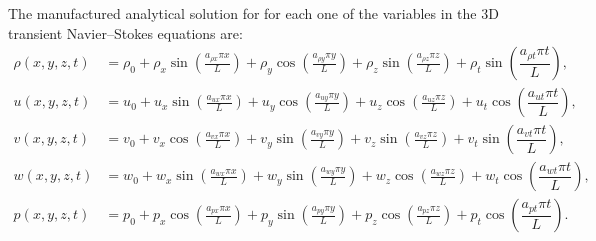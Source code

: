 \documentclass[10pt]{article}
\begin{document}
The manufactured analytical solution for for each one of the variables in the 3D transient Navier--Stokes equations are:
\begin{equation}
\begin{split}
\label{eq:manufactured_3d}
\rho\left( x ,y ,z,t\right) &=  \rho_{0}+ \rho_{x} \sin\left(\frac{a_{ \rho  x} \pi x}{L}\right)+ \rho_{y} \cos\left(\frac{a_{ \rho  y} \pi y}{L}\right) + \rho_{z} \sin\left(\frac{a_{ \rho  z} \pi z}{L}\right) + \rho_t \sin\left(\dfrac{a_{\rho t} \pi t}{L}\right),\\
u\left( x ,y ,z,t\right) &= u_{0}+u_{x} \sin\left(\frac{a_{u  x} \pi x}{L}\right)+u_{y} \cos\left(\frac{a_{u  y} \pi y}{L}\right)+u_{z} \cos\left(\frac{a_{u  z} \pi z}{L}\right) + u_t \cos\left(\dfrac{a_{u t} \pi t}{L}\right),\\
v\left( x ,y ,z,t\right) &= v_{0}+v_{x} \cos\left(\frac{a_{v  x} \pi x}{L}\right)+v_{y} \sin\left(\frac{a_{v  y} \pi y}{L}\right)+v_{z} \sin\left(\frac{a_{v  z} \pi z}{L}\right)+ v_t \sin\left(\dfrac{a_{v t} \pi t}{L}\right), \\
w\left( x ,y ,z,t\right) &= w_{0}+w_{x} \sin\left(\frac{a_{w  x} \pi x}{L}\right)+w_{y} \sin\left(\frac{a_{w  y} \pi y}{L}\right)+ w_{z} \cos\left(\frac{a_{w  z} \pi z}{L}\right)+ w_t \cos\left(\dfrac{a_{w t} \pi t}{L}\right) ,\\
p\left( x ,y ,z,t\right) &= p_{0}+p_{x} \cos\left(\frac{a_{p  x} \pi x}{L}\right)+p_{y} \sin\left(\frac{a_{p  y} \pi y}{L}\right)+ p_{z} \cos\left(\frac{a_{p  z} \pi z}{L}\right)+ p_t \cos\left(\dfrac{a_{p t} \pi t}{L}\right).\\
\end{split}
\end{equation}
\end{document}
